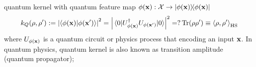 \begin{definition}\label{def:quantum_kernel}
	quantum kernel 
	with quantum feature map $\phi(\vb{x}): \mathcal{X}\to \op{\phi(\vb{x})}$
	\begin{equation}
		k_Q(\rho,\rho') := \abs{\ip{\phi(\vbx)}{\phi(\vbx')}}^2 =\abs{\mel{0}{\U_{\phi(\vbx)}^\dagger \U_{\phi(\vbx')} }{0}}^2 =? \Tr(\rho\rho') \equiv \expval{\dm,\dm'}_{\textup{HS}}
	\end{equation}
	where $U_{\phi(\vb{x})}$ is a quantum circuit or physics process that encoding an input $\vb{x}$.
	In quantum physics, quantum kernel is also known as transition amplitude (quantum propagator);
\end{definition}


